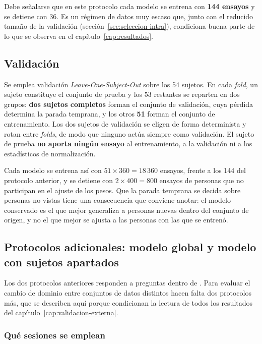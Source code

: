 Debe señalarse que en este protocolo cada modelo se entrena con
\textbf{144 ensayos} y se detiene con 36. Es un régimen de datos muy escaso que, junto
con el reducido tamaño de la validación (sección~\ref{sec:seleccion-intra}), condiciona
buena parte de lo que se observa en el capítulo~\ref{cap:resultados}.

\subsection{Validación \loso{}}

Se emplea validación \textit{Leave-One-Subject-Out} sobre los 54 sujetos. En cada
\textit{fold}, un sujeto constituye el conjunto de prueba y los $53$ restantes se reparten
en dos grupos: \textbf{dos sujetos completos} forman el conjunto de validación, cuya pérdida
determina la parada temprana, y los otros \textbf{51} forman el conjunto de entrenamiento. Los
dos sujetos de validación se eligen de forma determinista y rotan entre \textit{folds}, de
modo que ninguno actúa siempre como validación. El sujeto de prueba \textbf{no aporta ningún
ensayo} al entrenamiento, a la validación ni a los estadísticos de normalización.

Cada modelo se entrena así con $51 \times 360 = 18\,360$ ensayos, frente a los 144 del
protocolo anterior, y se detiene con $2 \times 400 = 800$ ensayos de personas que no
participan en el ajuste de los pesos. Que la parada temprana se decida sobre personas no
vistas tiene una consecuencia que conviene anotar: el modelo conservado es el que mejor
generaliza a personas nuevas dentro del conjunto de origen, y no el que mejor se ajusta a
las personas con las que se entrenó.

\subsection{Protocolos adicionales: modelo global y modelo con sujetos apartados}
\label{sec:protocolos-extra}

Los dos protocolos anteriores responden a preguntas dentro de \openbmi{}. Para evaluar el
cambio de dominio entre conjuntos de datos distintos hacen falta dos protocolos más, que se
describen aquí porque condicionan la lectura de todos los resultados del
capítulo~\ref{cap:validacion-externa}.

\subsubsection{Qué sesiones se emplean}

